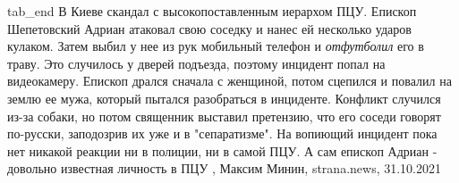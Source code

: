   tab_end
\fi
В Киеве скандал с высокопоставленным иерархом ПЦУ. Епископ Шепетовский Адриан
атаковал свою соседку и нанес ей несколько ударов кулаком. Затем выбил у нее из
рук мобильный телефон и \emph{отфутболил} его в траву.  Это случилось у дверей
подъезда, поэтому инцидент попал на видеокамеру. Епископ дрался сначала с
женщиной, потом сцепился и повалил на землю ее мужа, который пытался
разобраться в инциденте.  Конфликт случился из-за собаки, но потом священник
выставил претензию, что его соседи говорят по-русски, заподозрив их уже и в
"сепаратизме".  На вопиющий инцидент пока нет никакой реакции ни в полиции, ни
в самой ПЦУ. А сам епископ Адриан - довольно известная личность в ПЦУ
, 
Максим Минин, strana.news, 31.10.2021
